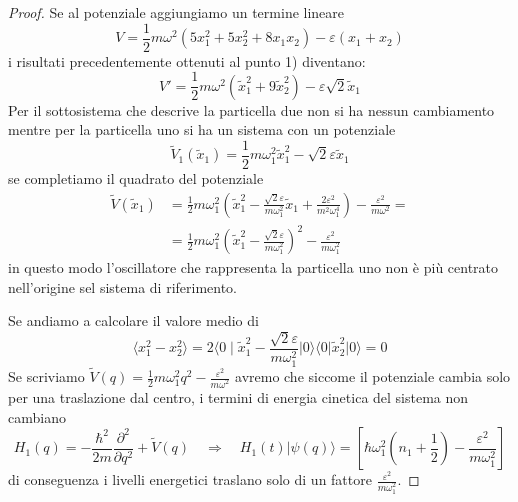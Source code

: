 \begin{proof}
Se al potenziale aggiungiamo un termine lineare 
\begin{equation*}
	V = \frac{1}{2}m \omega^2(5x_1^2+5x_2^2+8x_1x_2) - \varepsilon(x_1 +x_2)
\end{equation*}
i risultati precedentemente ottenuti al punto 1) diventano:
\begin{equation*}
	V' = \frac{1}{2}m \omega^2(\tilde{x}_1^2 + 9 \tilde{x}_2^2) - \varepsilon \sqrt{2} \tilde{x}_1
\end{equation*}
Per il sottosistema che descrive la particella due non si ha nessun cambiamento mentre per la particella uno si ha un sistema con un potenziale
\begin{equation*}
	\tilde{V}_1(\tilde{x}_1) = \frac{1}{2}m\omega_1^2\tilde{x}_1^2 - \sqrt{2} \varepsilon \tilde{x}_1
\end{equation*}
se completiamo il quadrato del potenziale 
\begin{align*}
	\tilde{V}(\tilde{x}_1) & = \frac{1}{2}m \omega_1^2 \left(\tilde{x}_1^2 - \frac{\sqrt{2} \varepsilon }{m \omega_1^2}\tilde{x}_1 + \frac{2 \varepsilon^2}{m^2 \omega_1^4}\right) - \frac{\varepsilon^2}{m \omega^2} =  \\[0.5cm]
	&=\frac{1}{2}m \omega_1^2 \left( \tilde{x}_1^2 - \frac{\sqrt{2} \varepsilon}{m \omega_1^2}\right)^2 - \frac{\varepsilon^2}{m \omega_1^2}
\end{align*}
in questo modo l'oscillatore che rappresenta la particella uno non \`e pi\`u centrato nell'origine sel sistema di riferimento.

Se andiamo a calcolare il valore medio di
\begin{equation*}
	\langle x_1^2 -x_2^2 \rangle = 2 \langle 0 \mid \tilde{x}_1^2 - \frac{\sqrt{2} \varepsilon}{m \omega_1^2}|0 \rangle \langle 0|\tilde{x}_2^2 |0 \rangle = 0
\end{equation*} 
Se scriviamo $\tilde V(q) = \frac{1}{2}m \omega_1^2q^2 - \frac{\varepsilon^2}{m \omega^2}$ avremo che siccome il potenziale cambia solo per una traslazione dal centro, i termini di energia cinetica del sistema non cambiano
\begin{equation*}
	H_1(q) = - \frac{\hbar^2}{2m} \frac{\partial^2}{\partial q^2} + \tilde{V}(q) \quad \Rightarrow \quad H_1(t)|\psi(q) \rangle = \left [ \hbar \omega_1^2 \left(n_1 + \frac{1}{2} \right) - \frac{\varepsilon^2}{m \omega_1^2}\right]
\end{equation*}
di conseguenza i livelli energetici traslano solo di un fattore $\frac{\varepsilon^2}{m \omega_1^2}$.
\end{proof}

